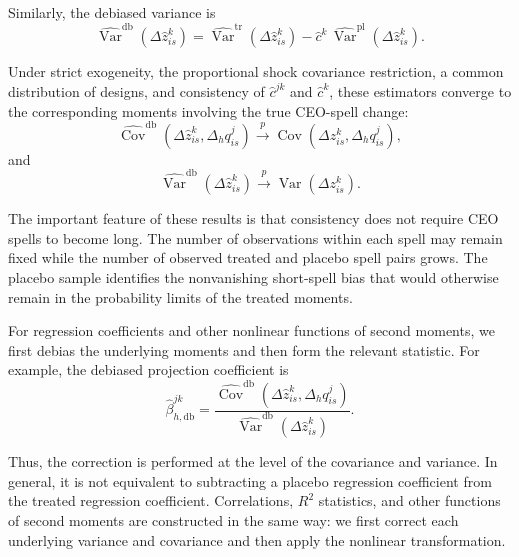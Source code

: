 \documentclass[11pt,a4paper]{article}
\begin{document}
Similarly, the debiased variance is
\begin{equation}
\widehat{\operatorname{Var}}^{\mathrm{db}}\!\left(
\Delta\widehat z_{is}^{k}
\right)
=
\widehat{\operatorname{Var}}^{\mathrm{tr}}\!\left(
\Delta\widehat z_{is}^{k}
\right)
-
\widehat c^k\,
\widehat{\operatorname{Var}}^{\mathrm{pl}}\!\left(
\Delta\widehat z_{is}^{k}
\right).
\label{eq:debiased_variance}
\end{equation}

Under strict exogeneity, the proportional shock covariance restriction,
a common distribution of designs, and consistency of $\widehat c^{jk}$ and $\widehat c^{k}$,
these estimators converge to the corresponding moments involving the
true CEO-spell change:
\begin{equation}
\widehat{\operatorname{Cov}}^{\mathrm{db}}\!\left(
\Delta\widehat z_{is}^{k},
\Delta_h q_{is}^{j}
\right)
\overset{p}{\longrightarrow}
\operatorname{Cov}\!\left(
\Delta z_{is}^{k},
\Delta_h q_{is}^{j}
\right),
\label{eq:debiased_covariance_plim}
\end{equation}
and
\begin{equation}
\widehat{\operatorname{Var}}^{\mathrm{db}}\!\left(
\Delta\widehat z_{is}^{k}
\right)
\overset{p}{\longrightarrow}
\operatorname{Var}\!\left(
\Delta z_{is}^{k}
\right).
\label{eq:debiased_variance_plim}
\end{equation}

The important feature of these results is that consistency does not
require CEO spells to become long. The number of observations within
each spell may remain fixed while the number of observed treated and
placebo spell pairs grows. The placebo sample identifies the
nonvanishing short-spell bias that would otherwise remain in the
probability limits of the treated moments.

For regression coefficients and other nonlinear functions of second
moments, we first debias the underlying moments and then form the
relevant statistic. For example, the debiased projection coefficient is
\begin{equation}
\widehat\beta_{h,\mathrm{db}}^{jk}
=
\frac{
\widehat{\operatorname{Cov}}^{\mathrm{db}}\!\left(
\Delta\widehat z_{is}^{k},
\Delta_h q_{is}^{j}
\right)
}{
\widehat{\operatorname{Var}}^{\mathrm{db}}\!\left(
\Delta\widehat z_{is}^{k}
\right)
}.
\label{eq:debiased_beta}
\end{equation}

Thus, the correction is performed at the level of the covariance and
variance. In general, it is not equivalent to subtracting a placebo
regression coefficient from the treated regression coefficient.
Correlations, $R^2$ statistics, and other functions of second moments
are constructed in the same way: we first correct each underlying
variance and covariance and then apply the nonlinear transformation.
\end{document}
